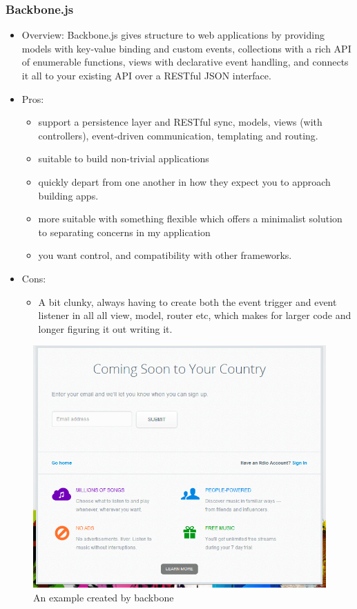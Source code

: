 \documentclass[14pt,a4paper]{extreport}
\begin{document}
			\subsubsection{Backbone.js}
			\begin{itemize}
				\item Overview: Backbone.js gives structure to web applications by providing models with key-value binding and custom events, collections with a rich API of enumerable functions, views with declarative event handling, and connects it all to your existing API over a RESTful JSON interface.
				\item Pros: 
					\begin{itemize}
						\item support a persistence layer and RESTful sync, models, views (with controllers), event-driven communication, templating and routing.
						\item suitable  to build non-trivial applications
						\item quickly depart from one another in how they expect you to approach building apps.
						\item more suitable with something flexible which offers a minimalist solution to separating concerns in my application
						\item you want control, and compatibility with other frameworks.
					\end{itemize}
				\item Cons:
					\begin{itemize}
						\item  A bit clunky, always having to create both the event trigger and event listener in all all view, model, router etc, which makes for larger code and longer figuring it out writing it.
					\end{itemize}
			\end{itemize}
			\begin{figure}
				\begin{center}
				\includegraphics[scale=0.9]{backbone.png}
				\caption{An example created by backbone}
				\end{center}
			\end{figure}
\end{document}
